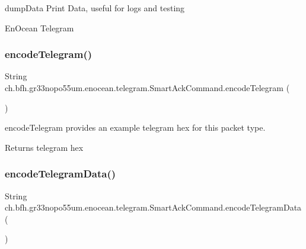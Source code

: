dump\+Data Print Data, useful for logs and testing 

En\+Ocean Telegram \hypertarget{classch_1_1bfh_1_1gr33nopo55um_1_1enocean_1_1telegram_1_1_smart_ack_command_ab75879e83985751c0a5c8f784a0fb796}{}\label{classch_1_1bfh_1_1gr33nopo55um_1_1enocean_1_1telegram_1_1_smart_ack_command_ab75879e83985751c0a5c8f784a0fb796} 
\subsubsection{\texorpdfstring{encode\+Telegram()}{encodeTelegram()}}
{\footnotesize\ttfamily String ch.\+bfh.\+gr33nopo55um.\+enocean.\+telegram.\+Smart\+Ack\+Command.\+encode\+Telegram (\begin{DoxyParamCaption}{ }\end{DoxyParamCaption})}

encode\+Telegram provides an example telegram hex for this packet type.

\begin{DoxyReturn}{Returns}
telegram hex 
\end{DoxyReturn}
\hypertarget{classch_1_1bfh_1_1gr33nopo55um_1_1enocean_1_1telegram_1_1_smart_ack_command_ab56598b5a3276916895d43120b4fe465}{}\label{classch_1_1bfh_1_1gr33nopo55um_1_1enocean_1_1telegram_1_1_smart_ack_command_ab56598b5a3276916895d43120b4fe465} 
\subsubsection{\texorpdfstring{encode\+Telegram\+Data()}{encodeTelegramData()}}
{\footnotesize\ttfamily String ch.\+bfh.\+gr33nopo55um.\+enocean.\+telegram.\+Smart\+Ack\+Command.\+encode\+Telegram\+Data (\begin{DoxyParamCaption}{ }\end{DoxyParamCaption})}

